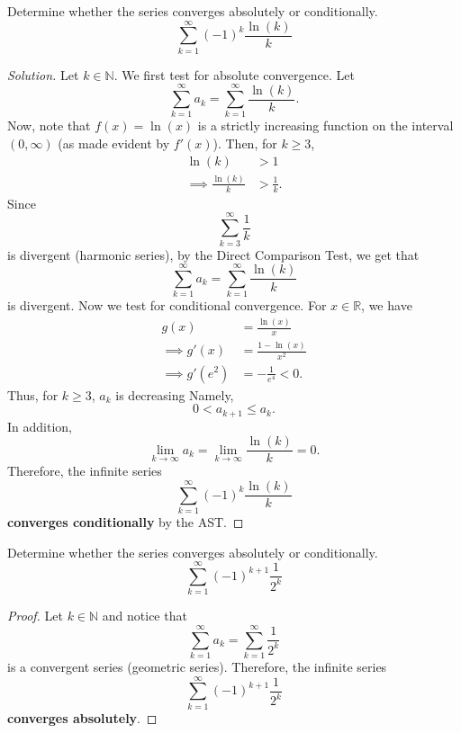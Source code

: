 \documentclass[compacto,10pt,comentarios]{aleph-notas}
\begin{document}
\begin{ejer}
    Determine whether the series converges absolutely or conditionally.
    $$
        \sum_{k=1}^{\infty} (-1)^{k} \frac{\ln(k)}{k}
    $$
\end{ejer}
\begin{proof}[Solution]
    Let $k \in \mathbb{N}$. We first test for absolute convergence. Let
    $$
        \sum_{k=1}^{\infty} a_k = \sum_{k=1}^{\infty} \frac{\ln(k)}{k}.
    $$
    Now, note that $f(x) = \ln(x)$ is a strictly increasing function on the interval $(0, \infty)$ (as made evident by $f'(x)$). Then, for $k \geq 3$,
    \begin{align*}
        \ln(k) & > 1 \\
        \implies \frac{\ln(k)}{k} & > \frac{1}{k}.
    \end{align*}
    Since
    $$
        \sum_{k=3}^{\infty} \frac{1}{k}
    $$
    is divergent (harmonic series), by the Direct Comparison Test, we get that
    $$
        \sum_{k=1}^{\infty} a_k = \sum_{k=1}^{\infty} \frac{\ln(k)}{k}
    $$
    is divergent. Now we test for conditional convergence. For $x \in \mathbb{R}$, we have
    \begin{align*}
        g(x) & = \frac{\ln(x)}{x} \\
        \implies g'(x) & = \frac{1-\ln(x)}{x^2} \\
        \implies g'(e^2) & = -\frac{1}{e^{4}} < 0.
    \end{align*}
    Thus, for $k \geq 3$, $a_k$ is decreasing Namely,
    $$
        0 < a_{k+1} \leq a_{k}.
    $$
    In addition,
    $$
        \lim_{k \to \infty} a_k
        = \lim_{k \to \infty} \frac{\ln(k)}{k} 
        = 0.
    $$
    Therefore, the infinite series
    $$
        \sum_{k=1}^{\infty} (-1)^{k} \frac{\ln(k)}{k}
    $$
    \textbf{converges conditionally} by the AST.
\end{proof}

\begin{ejer}
    Determine whether the series converges absolutely or conditionally.
    $$
        \sum_{k=1}^{\infty} (-1)^{k+1} \frac{1}{2^{k}}
    $$
\end{ejer}
\begin{proof}
    Let $k \in \mathbb{N}$ and notice that
    $$
        \sum_{k=1}^{\infty} a_k = \sum_{k=1}^{\infty} \frac{1}{2^{k}}
    $$
    is a convergent series (geometric series). Therefore, the infinite series
    $$
        \sum_{k=1}^{\infty} (-1)^{k+1} \frac{1}{2^{k}}
    $$
    \textbf{converges absolutely}.
\end{proof}
\end{document}
